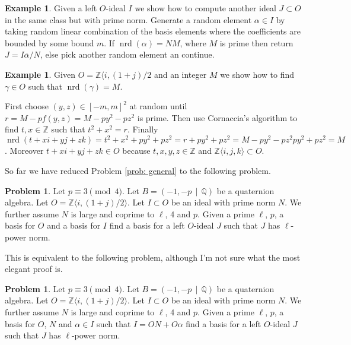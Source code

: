 \documentclass[10pt]{article}
\theoremstyle{plain}
\theoremstyle{definition}
\newtheorem{example}[theorem]{Example}
\newtheorem{prob}[theorem]{Problem}
\newcommand{\op}{\operatorname}
\newcommand{\Z}{\mathbb{Z}}
\newcommand{\Q}{\mathbb{Q}}
\newcommand{\nrd}{\op{nrd}}
\begin{document}
\begin{example}
    Given a left \( O \)-ideal \( I \) we show how to compute another ideal \( J \subset O \) in the same class but with prime norm.
    Generate a random element \( \alpha \in I \) by taking random linear combination of the basis elements where the coefficients are bounded by some bound \( m \).
    If \( \nrd(\alpha) = NM \), where \( M \) is prime then return \( J = I \overline{\alpha} / N \), else pick another random element an continue.
\end{example}


\begin{example}
    Given \( O = \Z \langle i, (1+j) / 2 \) and an integer \( M \) we show how to find \( \gamma \in O \) such that \( \nrd(\gamma) = M \).

    First choose \( (y, z) \in [-m , m]^2 \) at random until \( r = M - pf(y, z) = M - py^2 - pz^2\) is prime.
    Then use Cornaccia's algorithm to find \( t, x \in \Z \) such that \(  t^2 + x^2 = r.\)
    Finally \( \nrd(t + xi + yj + zk) = t^2 + x^2 + py^2 + pz^2 = r + py^2 + pz^2 = M - py^2 - pz^2 py^2 + pz^2 = M\).
    Moreover \( t + xi + yj + zk \in O \) because \( t, x, y, z \in \Z \) and \( \Z \langle i ,j, k \rangle \subset O \).
\end{example}


So far we have reduced Problem \ref{prob: general} to the following problem.
\begin{prob} \label{prob: prime norm}
    Let \( p \equiv 3 \pmod{4} \).
    Let \( B =  (-1, -p \, \mid \, \Q) \) be a quaternion algebra.
    Let \( O = \Z \langle i, (1+j) / 2 \rangle \).
    Let \( I \subset O \) be an ideal with prime norm \( N \).
    We further assume \( N \) is large and coprime to \( \ell \), 4 and \( p \).
    Given a prime \( \ell \), \( p \), a basis for \( O \) and a basis for \( I \) find a basis for a left \( O \)-ideal \( J \) such that \( J \) has \( \ell \)-power norm.
\end{prob}

This is equivalent to the following problem, although I'm not sure what the most elegant proof is.
\begin{prob} \label{prob: prime norm}
    Let \( p \equiv 3 \pmod{4} \).
    Let \( B =  (-1, -p \, \mid \, \Q) \) be a quaternion algebra.
    Let \( O = \Z \langle i, (1+j) / 2 \rangle \).
    Let \( I \subset O \) be an ideal with prime norm \( N \).
    We further assume \( N \) is large and coprime to \( \ell \), 4 and \( p \).
    Given a prime \( \ell \), \( p \), a basis for \( O \), \( N \) and \( \alpha \in I \) such that \( I = ON + O\alpha \) find a basis for a left \( O \)-ideal \( J \) such that \( J \) has \( \ell \)-power norm.
\end{prob}
\end{document}
